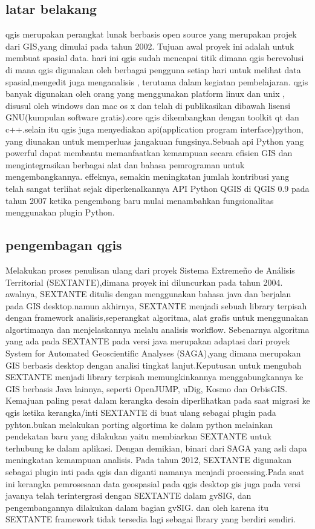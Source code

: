 	 \subsection{latar belakang}
		qgis merupakan perangkat lunak berbasis open source yang merupakan projek dari GIS,yang dimulai pada tahun 2002. Tujuan awal proyek ini adalah untuk membuat spasial data. hari ini qgis sudah mencapai titik dimana qgis berevolusi di mana qgis digunakan oleh berbagai pengguna setiap hari untuk melihat data spasial,mengedit juga menganalisis , terutama dalam kegiatan pembelajaran.
	 qgis banyak digunakan oleh orang yang menggunakan platform linux dan unix , disusul oleh windows dan mac os x dan telah di publikasikan dibawah lisensi GNU(kumpulan software gratis).core qgis dikembangkan dengan toolkit qt dan c++.selain itu qgis juga menyediakan api(application program interface)python, yang diunakan untuk memperluas jangakuan fungsinya.Sebuah api Python yang powerful dapat membantu memanfaatkan kemampuan secara efisien GIS dan mengintegrasikan berbagai alat dan bahasa pemrograman untuk mengembangkannya.
	 effeknya, semakin meningkatan jumlah kontribusi yang telah sangat terlihat sejak diperkenalkannya API Python QGIS di QGIS 0.9 pada tahun 2007 ketika pengembang baru mulai menambahkan fungsionalitas menggunakan plugin Python.

	 \subsection{pengembagan qgis}
		Melakukan proses penulisan ulang dari proyek Sistema Extremeño de Análisis Territorial (SEXTANTE),dimana proyek ini diluncurkan pada tahun 2004. awalnya, SEXTANTE ditulis dengan menggunakan bahasa java dan berjalan pada GIS desktop.namun akhirnya, SEXTANTE menjadi sebuah library terpisah dengan framework analisis,seperangkat algoritma, alat grafis untuk menggunakan algortimanya dan menjelaskannya melalu analisis workflow.
	 Sebenarnya algoritma yang ada pada SEXTANTE pada versi java merupakan adaptasi dari proyek System for Automated Geoscientific Analyses (SAGA),yang dimana merupakan GIS berbasis desktop dengan analisi tingkat lanjut.Keputusan untuk mengubah SEXTANTE menjadi library terpisah memungkinkannya menggabungkannya ke GIS berbasis Java lainnya, seperti OpenJUMP, uDig, Kosmo dan OrbisGIS.
	 Kemajuan paling pesat dalam kerangka desain diperlihatkan pada saat migrasi ke qgis ketika kerangka/inti SEXTANTE di buat ulang sebagai plugin pada pyhton.bukan melakukan porting algortima ke dalam python melainkan pendekatan baru yang dilakukan yaitu membiarkan SEXTANTE untuk terhubung ke dalam aplikasi. Dengan demikian, binari dari SAGA yang asli dapa meningkatan kemampuan analisis.
	 Pada tahun 2012, SEXTANTE digunakan sebagai plugin inti pada qgis dan diganti namanya menjadi processing\cite{graser2015processing}.Pada saat ini kerangka pemrosesaan data geospasial pada qgis desktop gis juga pada versi javanya telah terintergrasi dengan SEXTANTE dalam gvSIG, dan pengembangannya dilakukan dalam bagian gvSIG. dan oleh karena itu SEXTANTE framework tidak tersedia lagi sebagai lbrary yang berdiri sendiri.

